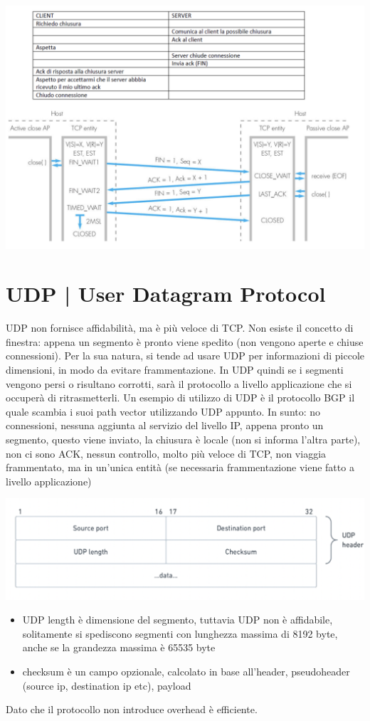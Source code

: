 \documentclass[11pt, oneside]{article}   	%
\begin{document}
\begin{center}
\includegraphics[scale=0.5]{closeup}
\end{center}

\section*{UDP | User Datagram Protocol}
UDP non fornisce affidabilità, ma è più veloce di TCP. Non esiste il concetto di finestra: appena un segmento è pronto viene spedito (non vengono aperte e chiuse connessioni). Per la sua natura, si tende ad usare UDP per informazioni di piccole dimensioni, in modo da evitare frammentazione. In UDP quindi se i segmenti vengono persi o risultano corrotti, sarà il protocollo a livello applicazione che si occuperà di ritrasmetterli. Un esempio di utilizzo di UDP è il protocollo BGP il quale scambia i suoi path vector utilizzando UDP appunto. In sunto: no connessioni, nessuna aggiunta al servizio del livello IP, appena pronto un segmento, questo viene inviato, la chiusura è locale (non si informa l'altra parte), non ci sono ACK, nessun controllo, molto più veloce di TCP, non viaggia frammentato, ma in un'unica entità (se necessaria frammentazione viene fatto a livello applicazione)
\begin{center}
\includegraphics[scale=0.5]{udp}
\end{center}
\begin{itemize}
\item UDP length è dimensione del segmento, tuttavia UDP non è affidabile, solitamente si spediscono segmenti con lunghezza massima di 8192 byte, anche se la grandezza massima è 65535 byte
\item checksum è un campo opzionale, calcolato in base all'header, pseudoheader (source ip, destination ip etc), payload
\end{itemize}
Dato che il protocollo non introduce overhead è efficiente.
\end{document}
